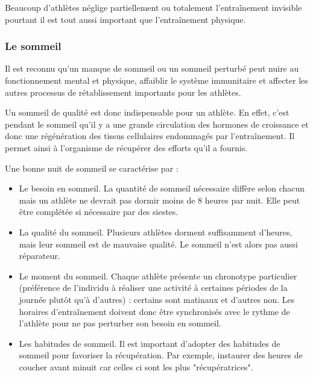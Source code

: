             Beaucoup d'athlètes néglige partiellement ou totalement l'entraînement invisible pourtant il est tout aussi important que l'entraînement physique. \\
            
    
                \subsubsection{Le sommeil}
        
                    Il est reconnu qu’un manque de sommeil ou un sommeil perturbé peut nuire au fonctionnement mental et physique, affaiblir le système immunitaire et affecter les autres processus de rétablissement importants pour les athlètes.
                    
                    Un sommeil de qualité est donc indispensable pour un athlète. En effet, c’est pendant le sommeil qu’il y a une grande circulation des hormones de croissance et donc une régénération des tissus cellulaires endommagés par l’entraînement. Il permet ainsi à l’organisme de récupérer des efforts qu’il a fournis. 
                    
                    Une bonne nuit de sommeil se caractérise par :
                    \begin{itemize}
                        \item Le besoin en sommeil. La quantité de sommeil nécessaire diffère selon chacun mais un athlète ne devrait pas dormir moins de 8 heures par nuit. Elle peut être complétée si nécessaire par des siestes.
                     
                        \item La qualité du sommeil. Plusieurs athlètes dorment suffisamment d’heures,
                        mais leur sommeil est de mauvaise qualité. Le sommeil n'est alors pas aussi réparateur.
                        \item Le moment du sommeil. Chaque athlète présente un chronotype particulier (préférence de l’individu à réaliser une activité à certaines périodes de la journée plutôt qu’à d’autres) : certains sont matinaux et d'autres non. Les horaires d'entraînement doivent donc être synchronisés avec le rythme de l'athlète pour ne pas perturber son besoin en sommeil.
                        \item Les habitudes de sommeil. Il est important d'adopter des habitudes de sommeil pour favoriser la récupération. Par exemple, instaurer des heures de coucher avant minuit car celles ci sont les plus "récupératrices".
                    \end{itemize}
                
